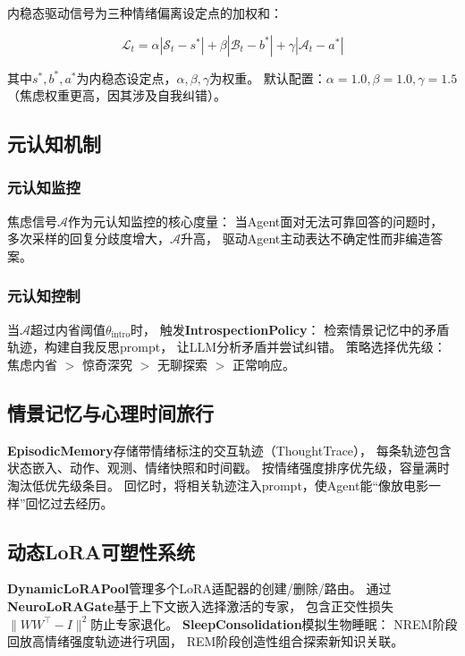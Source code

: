 \documentclass[11pt,a4paper]{article}
\newcommand{\surprise}{\mathcal{S}}
\newcommand{\boredom}{\mathcal{B}}
\newcommand{\anxiety}{\mathcal{A}}
\newcommand{\drive}{\mathcal{L}}
\begin{document}
内稳态驱动信号为三种情绪偏离设定点的加权和：

\begin{equation}
\drive_t = \alpha|\surprise_t - s^*| + \beta|\boredom_t - b^*| + \gamma|\anxiety_t - a^*|
\label{eq:drive}
\end{equation}

其中$s^*, b^*, a^*$为内稳态设定点，$\alpha, \beta, \gamma$为权重。
默认配置：$\alpha=1.0, \beta=1.0, \gamma=1.5$（焦虑权重更高，因其涉及自我纠错）。

\subsection{元认知机制}

\subsubsection{元认知监控}

焦虑信号$\anxiety$作为元认知监控的核心度量：
当Agent面对无法可靠回答的问题时，
多次采样的回复分歧度增大，$\anxiety$升高，
驱动Agent主动表达不确定性而非编造答案。

\subsubsection{元认知控制}

当$\anxiety$超过内省阈值$\theta_{\text{intro}}$时，
触发\textbf{IntrospectionPolicy}：
检索情景记忆中的矛盾轨迹，构建自我反思prompt，
让LLM分析矛盾并尝试纠错。
策略选择优先级：焦虑内省 $>$ 惊奇深究 $>$ 无聊探索 $>$ 正常响应。

\subsection{情景记忆与心理时间旅行}

\textbf{EpisodicMemory}存储带情绪标注的交互轨迹（ThoughtTrace），
每条轨迹包含状态嵌入、动作、观测、情绪快照和时间戳。
按情绪强度排序优先级，容量满时淘汰低优先级条目。
回忆时，将相关轨迹注入prompt，使Agent能``像放电影一样''回忆过去经历。

\subsection{动态LoRA可塑性系统}

\textbf{DynamicLoRAPool}管理多个LoRA适配器的创建/删除/路由。
通过\textbf{NeuroLoRAGate}基于上下文嵌入选择激活的专家，
包含正交性损失$\|WW^\top - I\|^2$防止专家退化。
\textbf{SleepConsolidation}模拟生物睡眠：
NREM阶段回放高情绪强度轨迹进行巩固，
REM阶段创造性组合探索新知识关联。
\end{document}
